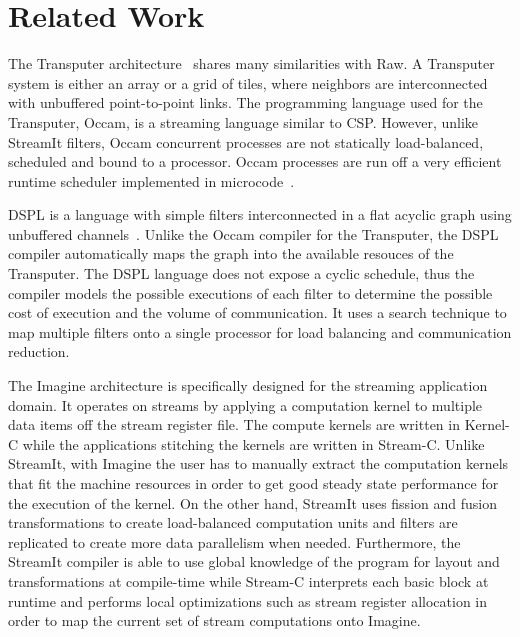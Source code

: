 \section{Related Work}
\label{sec:related}

The Transputer architecture~\cite{transputer88} shares many
similarities with Raw.  A Transputer system is either an array or a
grid of tiles, where neighbors are interconnected with unbuffered
point-to-point links. The programming language used for the
Transputer, Occam, is a streaming language similar to CSP.  However,
unlike StreamIt filters, Occam concurrent processes are not statically
load-balanced, scheduled and bound to a processor. Occam processes are
run off a very efficient runtime scheduler implemented in
microcode~\cite{may87communicating}.

DSPL is a language with simple filters interconnected in a flat acyclic
graph using unbuffered channels~\cite{Thiel93}.  Unlike the Occam
compiler for the Transputer, the DSPL compiler automatically maps the
graph into the available resouces of the Transputer. The DSPL language
does not expose a cyclic schedule, thus the compiler models the
possible executions of each filter to determine the possible cost of
execution and the volume of communication. It uses a search technique
to map multiple filters onto a single processor for load balancing and
communication reduction. 

The Imagine architecture is specifically designed for the streaming
application domain.  It operates on streams by applying a computation
kernel to multiple data items off the stream register file.  The
compute kernels are written in Kernel-C while the applications
stitching the kernels are written in Stream-C.  Unlike StreamIt, with
Imagine the user has to manually extract the computation kernels that
fit the machine resources in order to get good steady state
performance for the execution of the kernel.  On the other hand,
StreamIt uses fission and fusion transformations to create
load-balanced computation units and filters are replicated to create
more data parallelism when needed.  Furthermore, the StreamIt compiler
is able to use global knowledge of the program for layout and
transformations at compile-time while Stream-C interprets each basic
block at runtime and performs local optimizations such as stream
register allocation in order to map the current set of stream
computations onto Imagine.

